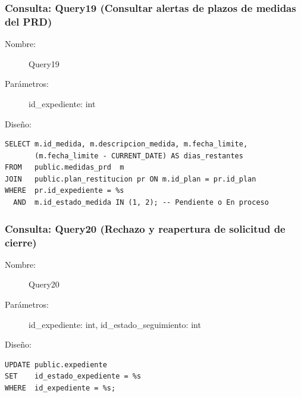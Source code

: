 \subsubsection{Consulta: Query19 (Consultar alertas de plazos de medidas del PRD)}
\begin{description}
    \item[Nombre:] Query19
    \item[Parámetros:] id\_expediente: int
    \item[Diseño:] \cdtEmpty
\end{description}
\begin{verbatim}
SELECT m.id_medida, m.descripcion_medida, m.fecha_limite, 
       (m.fecha_limite - CURRENT_DATE) AS dias_restantes
FROM   public.medidas_prd  m
JOIN   public.plan_restitucion pr ON m.id_plan = pr.id_plan
WHERE  pr.id_expediente = %s
  AND  m.id_estado_medida IN (1, 2); -- Pendiente o En proceso
\end{verbatim}

\subsubsection{Consulta: Query20 (Rechazo y reapertura de solicitud de cierre)}
\begin{description}
    \item[Nombre:] Query20
    \item[Parámetros:] id\_expediente: int, id\_estado\_seguimiento: int
    \item[Diseño:] \cdtEmpty
\end{description}
\begin{verbatim}
UPDATE public.expediente
SET    id_estado_expediente = %s
WHERE  id_expediente = %s;
\end{verbatim}
